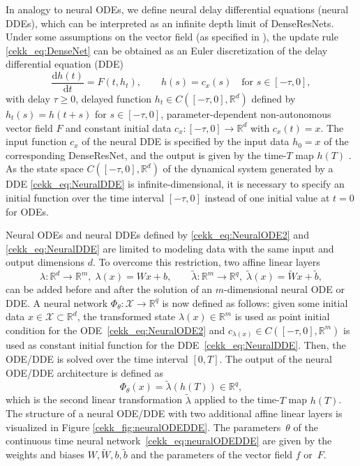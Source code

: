 \documentclass[10pt]{article}
\newcommand{\R}{{\mathbb R}}
\newcommand*{\dd}{\mathrm{d}}
\def\R{\mathbb{R}}
\begin{document}
In analogy to neural ODEs, we define neural delay differential equations (neural DDEs),  which can be interpreted as an infinite depth limit of DenseResNets. Under some assumptions on the vector field (as specified in \cite{KuehnKuntz2025}), the update rule \eqref{cekk_eq:DenseNet} can be obtained as an Euler discretization of the delay differential equation (DDE)
\begin{equation}\label{cekk_eq:NeuralDDE}
	\frac{\dd h(t)}{\dd t} = F(t,h_t), \qquad h(s) = c_x(s) \quad \text{for } s \in [-\tau,0],
\end{equation}
with delay $\tau \geq 0$, delayed function $h_t \in C([-\tau,0],\R^d)$ defined by $h_t(s) = h(t+s)$ for $s\in[-\tau,0]$, parameter-dependent non-autonomous vector field $F$ and constant initial data $c_x:[-\tau,0]\rightarrow \mathbb{R}^d$ with $c_x(t) = x$. The input function $c_x$ of the neural DDE is specified by the input data $h_0 = x$ of the corresponding DenseResNet, and the output is given by the time-$T$ map $h(T)$ \cite{KuehnKuntz2025,Zhu2021}. As the state space $C([-\tau,0],\R^d)$ of the dynamical system generated by a DDE \eqref{cekk_eq:NeuralDDE} is infinite-dimensional, it is necessary to specify an initial function over the time interval $[-\tau,0]$ instead of one initial value at $t = 0$ for ODEs.

Neural ODEs and neural DDEs defined by  \eqref{cekk_eq:NeuralODE2} and \eqref{cekk_eq:NeuralDDE} are limited to modeling data with the same input and output dimensions $d$. To overcome this restriction, two affine linear layers 
\begin{equation}
	\lambda: \R^d \rightarrow \R^m, \; \lambda(x) = Wx+b, \qquad \tilde\lambda: \R^m \rightarrow \R^q, \; \tilde \lambda(x) = \widetilde Wx+ \tilde b,
\end{equation}
can be added before and after the solution of an $m$-dimensional neural ODE or DDE. A neural network $\Phi_\theta: \mathcal{X}\rightarrow\R^q$ is now defined as follows: given some initial data $x\in\mathcal{X} \subset \R^d$, the transformed state $\lambda(x)\in\R^m$ is used as point initial condition for the ODE~\eqref{cekk_eq:NeuralODE2} and $c_{\lambda(x)}\in C([-\tau,0],\R^m)$ is used as constant initial function for the DDE~\eqref{cekk_eq:NeuralDDE}. Then, the ODE/DDE is solved over the time interval $[0,T]$. The output of the neural ODE/DDE architecture is defined as
\begin{equation}\label{cekk_eq:neuralODEDDE}
	\Phi_\theta(x) = \tilde \lambda(h(T)) \in \R^q,
\end{equation}
which is the second linear transformation $\tilde \lambda$ applied to the time-$T$ map $h(T)$. The structure of a neural ODE/DDE with two additional affine linear layers is visualized in Figure \ref{cekk_fig:neuralODEDDE}. The parameters~$\theta$ of the continuous time neural network~\eqref{cekk_eq:neuralODEDDE} are given by the weights and biases $W,\widetilde W, b, \tilde b$ and the parameters of the vector field $f$ or~$F$. 
\end{document}

